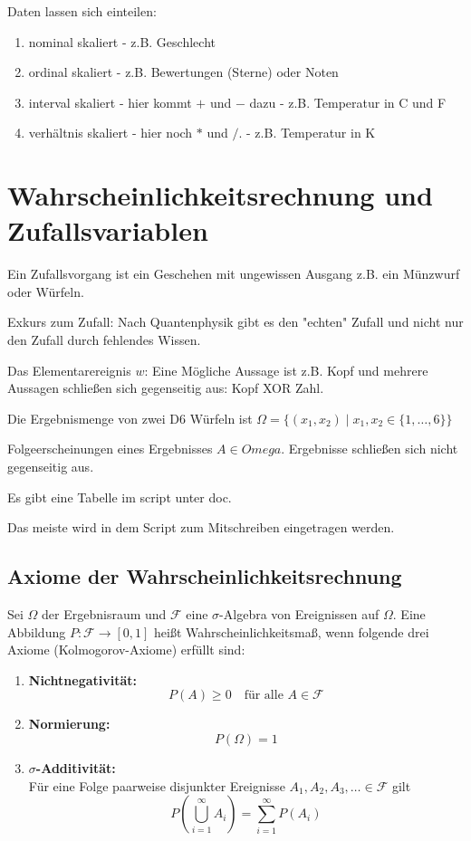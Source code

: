 \documentclass[a4paper]{article}
\begin{document}
Daten lassen sich einteilen:

\begin{enumerate}
    \item nominal skaliert - z.B. Geschlecht
    \item ordinal skaliert - z.B. Bewertungen (Sterne) oder Noten
    \item interval skaliert - hier kommt $+$ und $-$ dazu - z.B. Temperatur in C und F
    \item verhältnis skaliert - hier noch $*$ und $/$. - z.B. Temperatur in K
\end{enumerate}

\section{Wahrscheinlichkeitsrechnung und Zufallsvariablen}

Ein Zufallsvorgang ist ein Geschehen mit ungewissen Ausgang z.B. ein Münzwurf oder Würfeln.

Exkurs zum Zufall: Nach Quantenphysik gibt es den "echten" Zufall und nicht nur den Zufall durch fehlendes Wissen.

Das Elementarereignis $w$: Eine Mögliche Aussage ist z.B. Kopf und mehrere Aussagen schließen sich gegenseitig aus: Kopf XOR Zahl.

Die Ergebnismenge von zwei D6 Würfeln ist $\Omega = \{(x_1, x_2) \mid x_1, x_2 \in \{1, \dots, 6\} \}$

Folgeerscheinungen eines Ergebnisses  $A \in Omega$. Ergebnisse schließen sich nicht gegenseitig aus.

Es gibt eine Tabelle im script unter doc.

Das meiste wird in dem Script zum Mitschreiben eingetragen werden.

\subsection{Axiome der Wahrscheinlichkeitsrechnung}

Sei $\Omega$ der Ergebnisraum und $\mathcal{F}$ eine $\sigma$-Algebra von Ereignissen auf $\Omega$.  
Eine Abbildung $P : \mathcal{F} \rightarrow [0,1]$ heißt Wahrscheinlichkeitsmaß, wenn folgende drei Axiome (Kolmogorov-Axiome) erfüllt sind:

\begin{enumerate}
    \item \textbf{Nichtnegativität:}
    \[
    P(A) \geq 0 \quad \text{für alle } A \in \mathcal{F}
    \]

    \item \textbf{Normierung:}
    \[
    P(\Omega) = 1
    \]

    \item \textbf{$\sigma$-Additivität:} \\
    Für eine Folge paarweise disjunkter Ereignisse $A_1, A_2, A_3, \dots \in \mathcal{F}$ gilt
    \[
    P\left(\bigcup_{i=1}^{\infty} A_i\right)
    =
    \sum_{i=1}^{\infty} P(A_i)
    \]
\end{enumerate}
\end{document}

